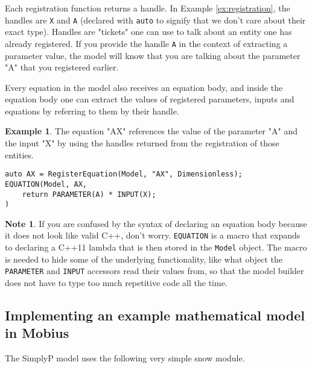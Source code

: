 \documentclass[11pt]{article}
\theoremstyle{definition}
\newtheorem{mynote}{Note}
\newenvironment{note}%
  {\begin{lrbox}{\notebox}%
   \begin{minipage}{\dimexpr\linewidth-2\fboxsep}
   \begin{mynote}}%
  {\end{mynote}%
   \end{minipage}%
   \end{lrbox}%
   \begin{trivlist}
     \item[]\colorbox{silver}{\usebox\notebox}
   \end{trivlist}}
\newtheorem{myexample}{Example}
\newenvironment{example}%
  {\begin{lrbox}{\examplebox}%
   \begin{minipage}{\dimexpr\linewidth-2\fboxsep}
   \begin{myexample}}%
  {\end{myexample}%
   \end{minipage}%
   \end{lrbox}%
   \begin{trivlist}
     \item[]\colorbox{silver}{\usebox\examplebox}
   \end{trivlist}}
\begin{document}
Each registration function returns a handle. In Example \ref{ex:registration}, the handles are {\tt X} and {\tt A} (declared with {\tt auto} to signify that we don't care about their exact type). Handles are "tickets" one can use to talk about an entity one has already registered. If you provide the handle {\tt A} in the context of extracting a parameter value, the model will know that you are talking about the parameter "A" that you registered earlier.

Every equation in the model also receives an equation body, and inside the equation body one can extract the values of registered parameters, inputs and equations by referring to them by their handle.

\begin{example}\label{ex:equation}
The equation "AX" references the value of the parameter "A" and the input "X" by using the handles returned from the registration of those entities.
\begin{lstlisting}[style=mycpp]
auto AX = RegisterEquation(Model, "AX", Dimensionless);
EQUATION(Model, AX,
	return PARAMETER(A) * INPUT(X);
)
\end{lstlisting}
\end{example}

\begin{note}
If you are confused by the syntax of declaring an equation body because it does not look like valid C++, don't worry. {\tt EQUATION} is a macro that expands to declaring a C++11 lambda that is then stored in the {\tt Model} object. The macro is needed to hide some of the underlying functionality, like what object the {\tt PARAMETER} and {\tt INPUT} accessors read their values from, so that the model builder does not have to type too much repetitive code all the time.
\end{note}

\subsection{Implementing an example mathematical model in Mobius}

The SimplyP model \cite{jackson-blake17} uses the following very simple snow module.
\end{document}
